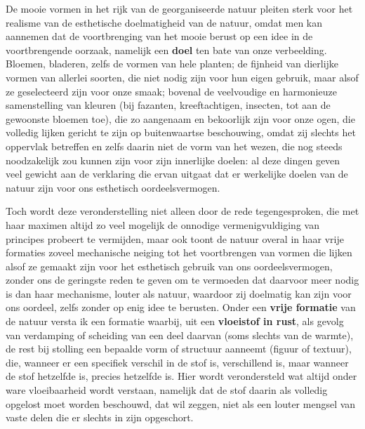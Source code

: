 De mooie vormen in het rijk van de georganiseerde natuur pleiten sterk voor het realisme van de esthetische doelmatigheid van de natuur, omdat men kan aannemen dat de voortbrenging van het mooie berust op een idee in de voortbrengende oorzaak, namelijk een \textbf{doel} ten bate van onze verbeelding. Bloemen, bladeren, zelfs de vormen van hele planten; de fijnheid van dierlijke vormen van allerlei soorten, die niet nodig zijn voor hun eigen gebruik, maar alsof ze geselecteerd zijn voor onze smaak; bovenal de veelvoudige en harmonieuze samenstelling van kleuren (bij fazanten, kreeftachtigen, insecten, tot aan de gewoonste bloemen toe), die zo aangenaam en bekoorlijk zijn voor onze ogen, die volledig lijken gericht te zijn op buitenwaartse beschouwing, omdat zij slechts het oppervlak betreffen en zelfs daarin niet de vorm van het wezen, die nog steeds noodzakelijk zou kunnen zijn voor zijn innerlijke doelen: al deze dingen geven veel gewicht aan de verklaring die ervan uitgaat dat er werkelijke doelen van de natuur zijn voor ons esthetisch oordeelsvermogen.

Toch wordt deze veronderstelling niet alleen door de rede tegengesproken, die met haar maximen altijd zo veel mogelijk de onnodige vermenigvuldiging van principes probeert te vermijden, maar ook toont de natuur overal in haar vrije formaties zoveel mechanische neiging tot het voortbrengen van vormen die lijken alsof ze gemaakt zijn voor het esthetisch gebruik van ons oordeelsvermogen, zonder ons de geringste reden te geven om te vermoeden dat daarvoor meer nodig is dan haar mechanisme, louter als natuur, waardoor zij doelmatig kan zijn voor ons oordeel, zelfs zonder op enig idee te berusten. Onder een \textbf{vrije formatie} van de natuur versta ik een formatie waarbij, uit een \textbf{vloeistof in rust}, als gevolg van verdamping of scheiding van een deel daarvan (soms slechts van de warmte), de rest bij stolling een bepaalde vorm of structuur aanneemt (figuur of textuur), die, wanneer er een specifiek verschil in de stof is, verschillend is, maar wanneer de stof hetzelfde is, precies hetzelfde is. Hier wordt verondersteld wat altijd onder ware vloeibaarheid wordt verstaan, namelijk dat de stof daarin als volledig opgelost moet worden beschouwd, dat wil zeggen, niet als een louter mengsel van vaste delen die er slechts in zijn opgeschort.

